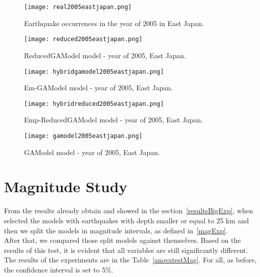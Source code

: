 \begin{figure}[H]
		\centering
		\texttt{[image: real2005eastjapan.png]}
		\caption{Earthquake occurrences in the year of 2005 in East Japan.}
		\label{real2005eastjapan}
\end{figure}


\begin{figure}[H]
	\centering
	\begin{minipage}{0.45\textwidth}
		\centering
		\texttt{[image: reduced2005eastjapan.png]}
		\caption{ReducedGAModel model - year of 2005, East Japan.}
		\label{reduced2005eastjapan}
	\end{minipage}
	\begin{minipage}{0.45\textwidth}
		\centering
		\texttt{[image: hybridgamodel2005eastjapan.png]}
		\caption{Em-GAModel model - year of 2005, East Japan.}
		\label{hybridgamodel2005eastjapan}
	\end{minipage}
\end{figure}

\begin{figure}[H]
	\begin{minipage}{0.45\textwidth}
		\centering
			\texttt{[image: hybridreduced2005eastjapan.png]}
			\caption{Emp-ReducedGAModel model - year of 2005, East Japan.}
			\label{hybridreduced2005eastjapan}
	\end{minipage}
	\begin{minipage}{0.45\textwidth}
		\centering
		\texttt{[image: gamodel2005eastjapan.png]}
		\caption{GAModel model - year of 2005, East Japan.}
		\label{gamodel2005eastjapan}
	\end{minipage}
\end{figure}

\section{Magnitude Study}
From the results already obtain and showed in the section~\ref{resultsBigExp}, when selected the models with earthquakes with depth smaller or equal to 25 km and then we split the models in magnitude intervals, as defined in~\ref{magExp}.\\

After that, we compared those split models against themselves. Based on the results of this test, it is evident that all variables are still significantly different. The results of the experiments are in the Table~\ref{anovatestMag}. For all, as before, the confidence interval is set to 5\%.\\

